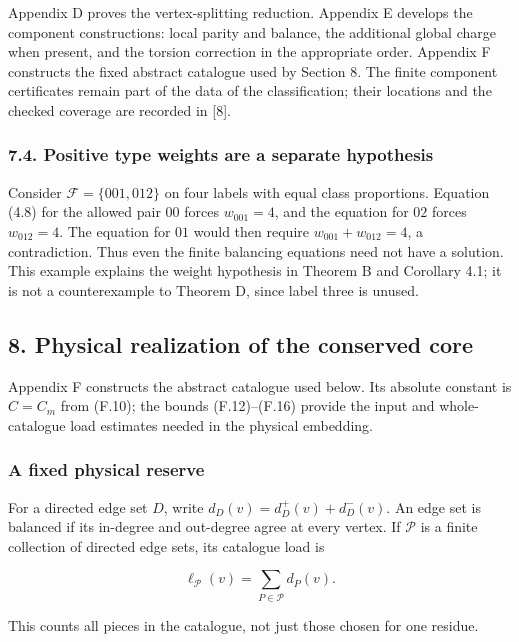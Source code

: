 \documentclass[english,11pt,a4paper]{article}
\begin{document}
Appendix D proves the vertex-splitting reduction. Appendix E develops the component constructions: local parity and balance, the additional global charge when present, and the torsion correction in the appropriate order. Appendix F constructs the fixed abstract catalogue used by Section 8. The finite component certificates remain part of the data of the classification; their locations and the checked coverage are recorded in {[}8{]}.

\subsubsection{7.4. Positive type weights are a separate hypothesis}\label{positive-type-weights-are-a-separate-hypothesis}

Consider \(\mathcal F=\{001,012\}\) on four labels with equal class proportions. Equation (4.8) for the allowed pair \(00\) forces \(w_{001}=4\), and the equation for \(02\) forces \(w_{012}=4\). The equation for \(01\) would then require \(w_{001}+w_{012}=4\), a contradiction. Thus even the finite balancing equations need not have a solution. This example explains the weight hypothesis in Theorem B and Corollary 4.1; it is not a counterexample to Theorem D, since label three is unused.

\subsection{8. Physical realization of the conserved core}\label{physical-realization-of-the-conserved-core}

Appendix F constructs the abstract catalogue used below. Its absolute constant is \(C=C_m\) from (F.10); the bounds (F.12)--(F.16) provide the input and whole-catalogue load estimates needed in the physical embedding.

\subsubsection{A fixed physical reserve}\label{a-fixed-physical-reserve}

For a directed edge set \(D\), write \(d_D(v)=d_D^+(v)+d_D^-(v)\). An edge set is balanced if its in-degree and out-degree agree at every vertex. If \(\mathcal P\) is a finite collection of directed edge sets, its catalogue load is

\[\ell_{\mathcal P}(v)=\sum_{P\in\mathcal P}d_P(v).\]

This counts all pieces in the catalogue, not just those chosen for one residue.
\end{document}

